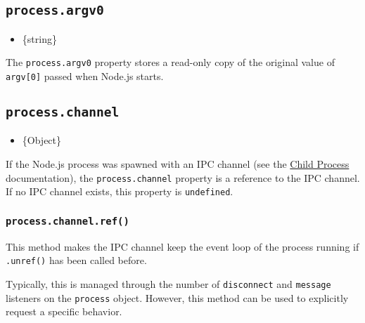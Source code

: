 \subsection{\texorpdfstring{\texttt{process.argv0}}{process.argv0}}\label{process.argv0}

\begin{itemize}
\tightlist
\item
  \{string\}
\end{itemize}

The \texttt{process.argv0} property stores a read-only copy of the
original value of \texttt{argv{[}0{]}} passed when Node.js starts.

\begin{Shaded}
\begin{Highlighting}[]
\end{Highlighting}
\end{Shaded}

\subsection{\texorpdfstring{\texttt{process.channel}}{process.channel}}\label{process.channel}

\begin{itemize}
\tightlist
\item
  \{Object\}
\end{itemize}

If the Node.js process was spawned with an IPC channel (see the
\href{child_process.md}{Child Process} documentation), the
\texttt{process.channel} property is a reference to the IPC channel. If
no IPC channel exists, this property is \texttt{undefined}.

\subsubsection{\texorpdfstring{\texttt{process.channel.ref()}}{process.channel.ref()}}\label{process.channel.ref}

This method makes the IPC channel keep the event loop of the process
running if \texttt{.unref()} has been called before.

Typically, this is managed through the number of
\texttt{\textquotesingle{}disconnect\textquotesingle{}} and
\texttt{\textquotesingle{}message\textquotesingle{}} listeners on the
\texttt{process} object. However, this method can be used to explicitly
request a specific behavior.


